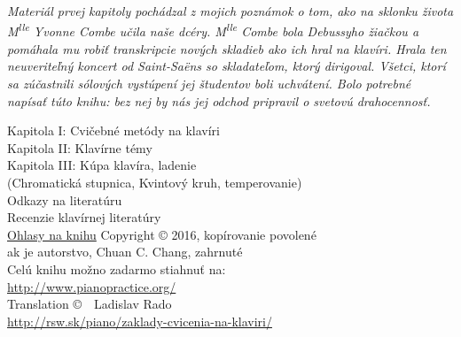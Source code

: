 \documentclass[11pt,a4paper]{book}
\begin{document}
\textit{Materiál prvej kapitoly pochádzal z mojich poznámok o tom, ako na sklonku života M\textsuperscript{lle} Yvonne Combe učila naše dcéry. M\textsuperscript{lle} Combe bola Debussyho žiačkou a pomáhala mu robiť transkripcie nových skladieb ako ich hral na klavíri. Hrala ten neuveriteľný koncert od Saint-Saëns so skladateľom, ktorý dirigoval. Všetci, ktorí sa zúčastnili sólových vystúpení jej študentov boli uchvátení. Bolo potrebné napísať túto knihu: bez nej by nás jej odchod pripravil o svetovú drahocennosť.}
\begin{center}
\vspace*{6em}
Kapitola I: Cvičebné metódy na klavíri
\vspace*{1em}\\
Kapitola II: Klavírne témy
\vspace*{1em}\\
Kapitola III: Kúpa klavíra, ladenie\\
(Chromatická stupnica, Kvintový kruh, temperovanie)
\vspace*{2em}\\
Odkazy na literatúru\\
Recenzie klavírnej literatúry
\vspace*{2em}\\
\href{http://www.pianopractice.org/testimonials.pdf}{Ohlasy na knihu}
\vfill
Copyright © 2016, kopírovanie povolené\\
ak je autorstvo, Chuan C. Chang, zahrnuté\\
Celú knihu možno zadarmo stiahnuť na:\\
\href{http://www.pianopractice.org/}{http://www.pianopractice.org/}\\
Translation \copyright\ \the\year\ Ladislav Rado\\
\href{http://rsw.sk/piano/zaklady-cvicenia-na-klaviri/}{http://rsw.sk/piano/zaklady-cvicenia-na-klaviri/}
\end{center}
\cleardoublepage
{}\setcounter{page}{1}%
\pagestyle{plain}
\tableofcontents
\begingroup
\vspace*{5em}
\end{document}
